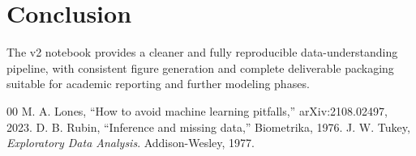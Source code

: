 \documentclass[conference]{IEEEtran}
\begin{document}
\section{Conclusion}
The v2 notebook provides a cleaner and fully reproducible data-understanding pipeline, with consistent figure generation and complete deliverable packaging suitable for academic reporting and further modeling phases.

\begin{thebibliography}{00}
 M. A. Lones, ``How to avoid machine learning pitfalls,'' arXiv:2108.02497, 2023.
 D. B. Rubin, ``Inference and missing data,'' Biometrika, 1976.
 J. W. Tukey, \emph{Exploratory Data Analysis}. Addison-Wesley, 1977.
\end{thebibliography}
\end{document}
